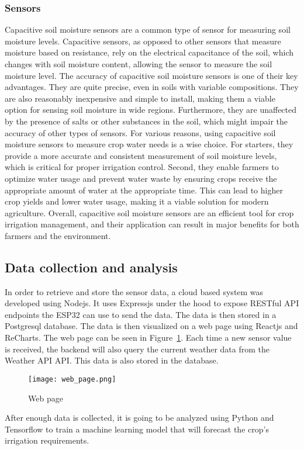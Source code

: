 \documentclass[11pt]{scrartcl} %
\begin{document}
\subsubsection{Sensors}
\label{sec:sensors}
Capacitive soil moisture sensors are a common type of sensor for measuring soil moisture levels. Capacitive sensors, as opposed to other sensors that measure moisture based on resistance, rely on the electrical capacitance of the soil, which changes with soil moisture content, allowing the sensor to measure the soil moisture level.
\newline The accuracy of capacitive soil moisture sensors is one of their key advantages. They are quite precise, even in soils with variable compositions. They are also reasonably inexpensive and simple to install, making them a viable option for sensing soil moisture in wide regions. Furthermore, they are unaffected by the presence of salts or other substances in the soil, which might impair the accuracy of other types of sensors.
\newline For various reasons, using capacitive soil moisture sensors to measure crop water needs is a wise choice. For starters, they provide a more accurate and consistent measurement of soil moisture levels, which is critical for proper irrigation control. Second, they enable farmers to optimize water usage and prevent water waste by ensuring crops receive the appropriate amount of water at the appropriate time. This can lead to higher crop yields and lower water usage, making it a viable solution for modern agriculture. Overall, capacitive soil moisture sensors are an efficient tool for crop irrigation management, and their application can result in major benefits for both farmers and the environment.
\subsection{Data collection and analysis}
\label{sec:data_collection}
In order to retrieve and store the sensor data, a cloud based system was developed using \gls{Nodejs}. It uses \gls{Expressjs} under the hood to expose RESTful API endpoints the ESP32 can use to send the data. The data is then stored in a \gls{Postgresql} database. The data is then visualized on a web page using \gls{Reactjs} and \gls{ReCharts}. The web page can be seen in Figure~\ref{fig:web_page}.
Each time a new sensor value is received, the backend will also query the current weather data from the \gls{Weather API} API. This data is also stored in the database.
\begin{figure}[h]
	\centering
	\texttt{[image: web\_page.png]}
	\caption{Web page}
	\label{fig:web_page}
\end{figure}
\newline After enough data is collected, it is going to be analyzed using \gls{Python} and \gls{Tensorflow} to train a machine learning model that will forecast the crop's irrigation requirements.
\end{document}

